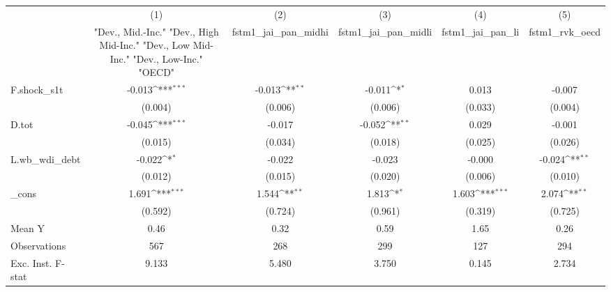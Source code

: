 {
\def\sym#1{\ifmmode^{#1}\else\(^{#1}\)\fi}
\begin{tabular}{l*{5}{c}}
\toprule
            &\multicolumn{1}{c}{(1)}&\multicolumn{1}{c}{(2)}&\multicolumn{1}{c}{(3)}&\multicolumn{1}{c}{(4)}&\multicolumn{1}{c}{(5)}\\
            &\multicolumn{1}{c}{ "Dev., Mid.-Inc." "Dev., High Mid-Inc." "Dev., Low Mid-Inc." "Dev., Low-Inc." "OECD" }&\multicolumn{1}{c}{fstm1\_jai\_pan\_midhi}&\multicolumn{1}{c}{fstm1\_jai\_pan\_midli}&\multicolumn{1}{c}{fstm1\_jai\_pan\_li}&\multicolumn{1}{c}{fstm1\_rvk\_oecd}\\
\midrule
F.shock\_s1t &      -0.013\sym{***}&      -0.013\sym{**} &      -0.011\sym{*}  &       0.013         &      -0.007         \\
            &     (0.004)         &     (0.006)         &     (0.006)         &     (0.033)         &     (0.004)         \\
\addlinespace
D.tot       &      -0.045\sym{***}&      -0.017         &      -0.052\sym{**} &       0.029         &      -0.001         \\
            &     (0.015)         &     (0.034)         &     (0.018)         &     (0.025)         &     (0.026)         \\
\addlinespace
L.wb\_wdi\_debt&      -0.022\sym{*}  &      -0.022         &      -0.023         &      -0.000         &      -0.024\sym{**} \\
            &     (0.012)         &     (0.015)         &     (0.020)         &     (0.006)         &     (0.010)         \\
\addlinespace
\_cons      &       1.691\sym{***}&       1.544\sym{**} &       1.813\sym{*}  &       1.603\sym{***}&       2.074\sym{**} \\
            &     (0.592)         &     (0.724)         &     (0.961)         &     (0.319)         &     (0.725)         \\
\midrule
Mean Y      &        0.46         &        0.32         &        0.59         &        1.65         &        0.26         \\
Observations&         567         &         268         &         299         &         127         &         294         \\
Exc. Inst. F-stat&       9.133         &       5.480         &       3.750         &       0.145         &       2.734         \\
\bottomrule
\end{tabular}
}
